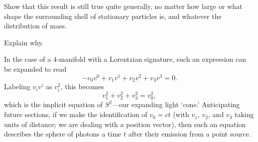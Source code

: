 \documentclass[../the-road-to-reality.tex]{subfiles}
\begin{document}
\begin{questions}
	\question Show that this result is still true quite generally, no matter how large or what shape the surrounding shell of stationary particles is, and whatever the distribution of mass.

	\question Explain why.

	\begin{solution}
		In the case of a $4$-manifold with a Lorentzian signature, such an expression can be expanded to read
		\[
		-v_0v^0 + v_1v^1 + v_2v^2 + v_3v^3 = 0
		.\] 
		Labeling $v_iv^i$ as $v_i^2$, this becomes
		\[
		v_1^2 + v_2^2 + v_3^2 = v_0^2
		,\] 
		which is the implicit equation of $S^2$---our expanding light `cone.' Anticipating future sections, if we make the identification of $v_0=ct$ (with $v_1$, $v_2$, and $v_3$ taking units of distance; we are dealing with a position vector), then such an equation describes the sphere of photons a time $t$ after their emission from a point source.
	\end{solution}

\end{questions}
\end{document}
